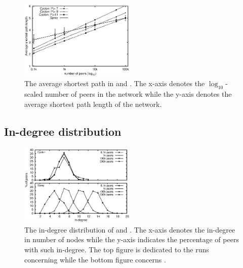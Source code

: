 \begin{figure}
  \centering
  \includegraphics[width=0.49\textwidth]{img/avgpath.eps}
  \caption{\label{fig:avgpath}The average shortest path in \SPRAY and
    \CYCLON. The x-axis denotes the $\log_{10}$-scaled number of peers in the
    network while the y-axis denotes the average shortest path length of the
    network.}
\end{figure}

\subsection{In-degree distribution}
\label{subsec:dist}

\begin{figure}
  \centering
  \includegraphics[width=0.49\textwidth]{img/histo.eps}
  \caption{\label{fig:histo}The in-degree distribution of \CYCLON and
    \SPRAY. The x-axis denotes the in-degree in number of nodes while the
    y-axis indicates the percentage of peers with such in-degree. The top
    figure is dedicated to the runs concerning \CYCLON while the bottom figure
    concerns \SPRAY.}
\end{figure}


